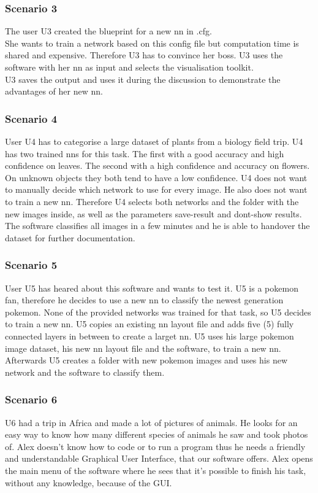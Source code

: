 \documentclass[parskip=full]{scrartcl}
\begin{document}
\subsubsection{Scenario 3}
The user U3 created the blueprint for a new \gls{nn} in .cfg.\\
She wants to train a network based on this config file but computation time is shared and expensive. Therefore U3 has to convince her boss.
U3 uses the software with her \gls{nn} as input and selects the visualisation toolkit.\\
U3 saves the output and uses it during the discussion to demonstrate the advantages of her new \gls{nn}.
\clearpage
\subsubsection{Scenario 4}
User U4 has to categorise a large dataset of plants from a biology field trip. U4 has two trained \glspl{nn} for this task. The first with a good accuracy and high confidence on leaves. The second with a high confidence and accuracy on flowers. On unknown objects they both tend to have a low confidence. U4 does not want to manually decide which network to use for every image. He also does not want to train a new \gls{nn}. Therefore U4 selects both networks and the folder with the new images inside, as well as the parameters save-result and dont-show results. The software classifies all images in a few minutes and he is able to handover the dataset for further documentation.
\subsubsection{Scenario 5}
User U5 has heared about this software and wants to test it.
U5 is a pokemon fan, therefore he decides to use a new \gls{nn} to classify the newest generation pokemon. None of the provided networks was trained for that task, so U5 decides to train a new \gls{nn}. U5 copies an existing \gls{nn} layout file and adds five (5) fully connected layers in between to create a larget \gls{nn}. U5 uses his large pokemon image dataset, his new \gls{nn} layout file and the software, to train a new \gls{nn}. 
Afterwards U5 creates a folder with new pokemon images and uses his new network and the software to classify them.
\subsubsection{Scenario 6}
U6 had a trip in Africa and made a lot of pictures of animals. He looks for an easy way to know how many different species of animals he saw and took photos of. Alex doesn't know how to code or to run a program thus he needs a friendly and understandable Graphical User Interface, that our software offers. Alex opens the main menu of the software where he sees that it's possible to finish his task, without any knowledge, because of the GUI. 
\clearpage
\end{document}
